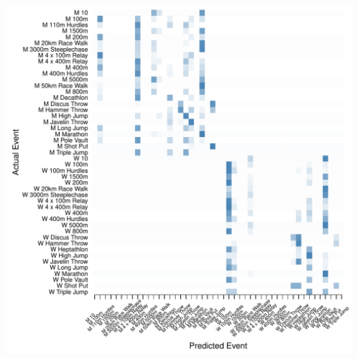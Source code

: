 \documentclass[landscape, paperwidth=42in, paperheight=36in,
fontscale=.35, margin=1in]{baposter}
\begin{document}
\begin{poster}
{\begin{center}
\begin{minipage}{0.45\textwidth}
\begin{center}
      \includegraphics[scale=0.27]{../graphics/athletesEV-tst.pdf}
    \end{center}
  \end{minipage}



\end{center}}
\end{poster}
\end{document}
